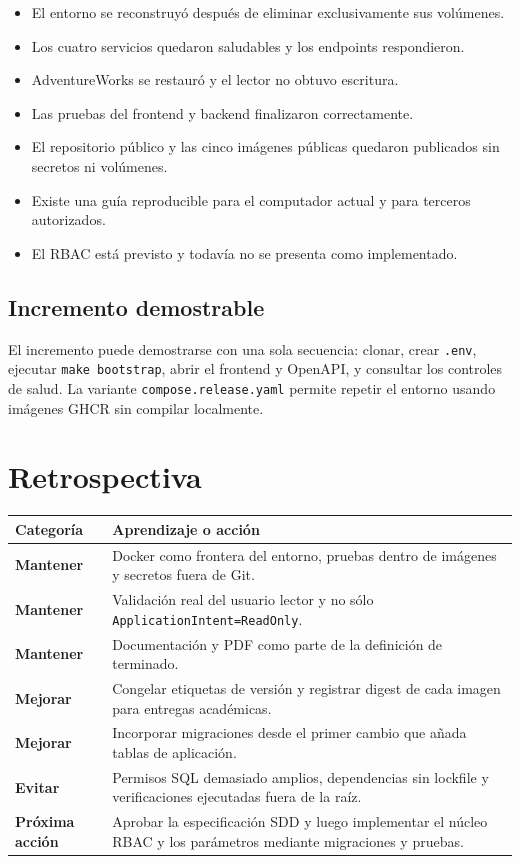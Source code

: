 \documentclass[11pt,letterpaper]{article}
\newcommand{\file}[1]{\texttt{#1}}
\begin{document}
\begin{itemize}
  \item[\textbf{Cumple.}] El entorno se reconstruyó después de eliminar exclusivamente sus volúmenes.
  \item[\textbf{Cumple.}] Los cuatro servicios quedaron saludables y los endpoints respondieron.
  \item[\textbf{Cumple.}] AdventureWorks se restauró y el lector no obtuvo escritura.
  \item[\textbf{Cumple.}] Las pruebas del frontend y backend finalizaron correctamente.
  \item[\textbf{Cumple.}] El repositorio público y las cinco imágenes públicas quedaron publicados sin secretos ni volúmenes.
  \item[\textbf{Cumple.}] Existe una guía reproducible para el computador actual y para terceros autorizados.
  \item[\textbf{Cumple.}] El RBAC está previsto y todavía no se presenta como implementado.
\end{itemize}

\subsection{Incremento demostrable}

El incremento puede demostrarse con una sola secuencia: clonar, crear \file{.env}, ejecutar \file{make bootstrap}, abrir el frontend y OpenAPI, y consultar los controles de salud. La variante \file{compose.release.yaml} permite repetir el entorno usando imágenes GHCR sin compilar localmente.

\section{Retrospectiva}

\begin{tabularx}{\textwidth}{@{}>{\bfseries}p{}X@{}}
  \toprule
  Categoría & Aprendizaje o acción \\
  \midrule
  Mantener & Docker como frontera del entorno, pruebas dentro de imágenes y secretos fuera de Git. \\
  Mantener & Validación real del usuario lector y no sólo \file{ApplicationIntent=ReadOnly}. \\
  Mantener & Documentación y PDF como parte de la definición de terminado. \\
  Mejorar & Congelar etiquetas de versión y registrar digest de cada imagen para entregas académicas. \\
  Mejorar & Incorporar migraciones desde el primer cambio que añada tablas de aplicación. \\
  Evitar & Permisos SQL demasiado amplios, dependencias sin lockfile y verificaciones ejecutadas fuera de la raíz. \\
  Próxima acción & Aprobar la especificación SDD y luego implementar el núcleo RBAC y los parámetros mediante migraciones y pruebas. \\
  \bottomrule
\end{tabularx}
\end{document}
